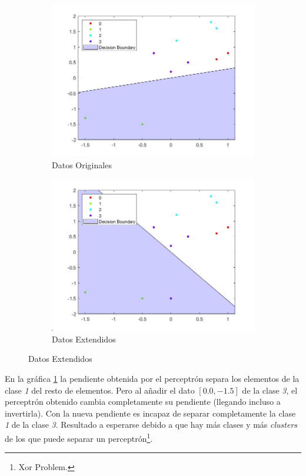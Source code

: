 \documentclass{article}
\begin{document}
\begin{figure}[H]
 \centering
 \begin{subfigure}{0.45\textwidth}
  \includegraphics[width=0.9\linewidth]{../images/I_ex1_basicData.jpg}
  \caption{Datos Originales}
  \label{bs}
 \end{subfigure}
 \begin{subfigure}{0.45\textwidth}
  \includegraphics[width=0.9\linewidth]{../images/I_ex1_extendedData.jpg}
  \caption{Datos Extendidos}
  \label{ed}
 \end{subfigure}
\end{figure}

En la gráfica \hyperref[bs]{\ref{bs}} la pendiente obtenida por el perceptrón
separa los elementos de la clase \textit{1} del resto de elementos. Pero al
añadir el dato \texttt{$\left[0.0, -1.5\right]$} de la clase \textit{3}, el perceptrón
obtenido cambia completamente su pendiente (llegando incluso a invertirla). Con
la nueva pendiente es incapaz de separar completamente la clase \textit{1} de la
clase \textit{3}. Resultado a esperarse debido a que hay más clases y más
\textit{clusters} de los que puede separar un perceptrón\footnote{Xor Problem.}.
\end{document}
